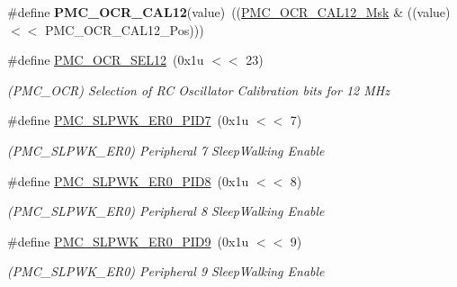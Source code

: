 \begin{DoxyCompactItemize}
\mbox{\label{group__SAMS70__PMC_gabe02650a445a5060a3c8904445b943d7}} 
\#define {\bfseries P\+M\+C\+\_\+\+O\+C\+R\+\_\+\+C\+A\+L12}(value)~((\mbox{\hyperlink{group__SAMV71__PMC_gaebcde6b9f684f22e620db9673ab3131a}{P\+M\+C\+\_\+\+O\+C\+R\+\_\+\+C\+A\+L12\+\_\+\+Msk}} \& ((value) $<$$<$ P\+M\+C\+\_\+\+O\+C\+R\+\_\+\+C\+A\+L12\+\_\+\+Pos)))
\item 
\mbox{\label{group__SAMS70__PMC_ga2dd373794cde6eef1c27f9a73d54f470}} 
\#define \mbox{\hyperlink{group__SAMS70__PMC_ga2dd373794cde6eef1c27f9a73d54f470}{P\+M\+C\+\_\+\+O\+C\+R\+\_\+\+S\+E\+L12}}~(0x1u $<$$<$ 23)
\begin{DoxyCompactList}\small\item\em (P\+M\+C\+\_\+\+O\+CR) Selection of RC Oscillator Calibration bits for 12 M\+Hz \end{DoxyCompactList}\item 
\mbox{\label{group__SAMS70__PMC_gaa59839bba436544207971815c2c11e56}} 
\#define \mbox{\hyperlink{group__SAMS70__PMC_gaa59839bba436544207971815c2c11e56}{P\+M\+C\+\_\+\+S\+L\+P\+W\+K\+\_\+\+E\+R0\+\_\+\+P\+I\+D7}}~(0x1u $<$$<$ 7)
\begin{DoxyCompactList}\small\item\em (P\+M\+C\+\_\+\+S\+L\+P\+W\+K\+\_\+\+E\+R0) Peripheral 7 Sleep\+Walking Enable \end{DoxyCompactList}\item 
\mbox{\label{group__SAMS70__PMC_gad5f6db0f89c81394a149de9b818d26ca}} 
\#define \mbox{\hyperlink{group__SAMS70__PMC_gad5f6db0f89c81394a149de9b818d26ca}{P\+M\+C\+\_\+\+S\+L\+P\+W\+K\+\_\+\+E\+R0\+\_\+\+P\+I\+D8}}~(0x1u $<$$<$ 8)
\begin{DoxyCompactList}\small\item\em (P\+M\+C\+\_\+\+S\+L\+P\+W\+K\+\_\+\+E\+R0) Peripheral 8 Sleep\+Walking Enable \end{DoxyCompactList}\item 
\mbox{\label{group__SAMS70__PMC_ga216d70ec1d38b2c139dd82ed58325b4b}} 
\#define \mbox{\hyperlink{group__SAMS70__PMC_ga216d70ec1d38b2c139dd82ed58325b4b}{P\+M\+C\+\_\+\+S\+L\+P\+W\+K\+\_\+\+E\+R0\+\_\+\+P\+I\+D9}}~(0x1u $<$$<$ 9)
\begin{DoxyCompactList}\small\item\em (P\+M\+C\+\_\+\+S\+L\+P\+W\+K\+\_\+\+E\+R0) Peripheral 9 Sleep\+Walking Enable \end{DoxyCompactList}\item 
$$
\end{DoxyCompactItemize}
